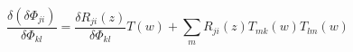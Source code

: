 \begin{equation}
\frac{\delta (\delta \Phi_{ji})}{\delta \Phi_{kl}}= \frac{\delta
R_{ji}(z)}
{\delta \Phi_{kl}} T(w) + \sum_m R_{ji}(z) T_{mk}(w) T_{lm}(w)
\end{equation}


